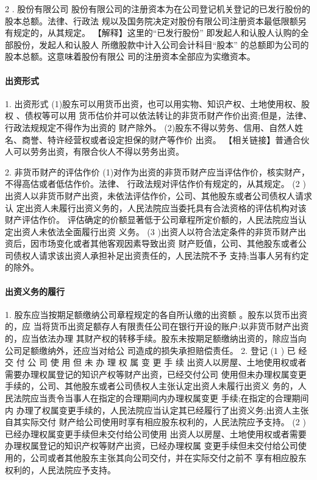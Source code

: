 \documentclass[UTF8,12pt]{ctexart}
\numberwithin{equation}{section} %
\numberwithin{figure}{section}
\numberwithin{table}{section}
\begin{document}
	2 . 股份有限公司 股份有限公司的注册资本为在公司登记机关登记的已发行股份的股本总额。法律、行政法 规以及国务院决定对股份有限公司注册资本最低限额另有规定的，从其规定。
	【解释】这里的“已发行股份” 即发起人和认股人认购的全部股份，发起人和认股人 所缴股款中计入公司会计科目“股本” 的总额即为公司的股本总额。这意味着股份有限公 司的注册资本全部应为实缴资本。
	
	\paragraph{出资形式}
	
	1. 出资形式
	(1)股东可以用货币出资，也可以用实物、知识产权、土地使用权、股权 、债权等可以用 货币估价并可以依法转让的非货币财产作价出资;但是，法律、行政法规规定不得作为出资的 财产除外。 (2)股东不得以劳务、信用、自然人姓名、商誉、特许经营权或者设定担保的财产等作价 出资。
	【相关链接】普通合伙人可以劳务出资，有限合伙人不得以劳务出资。
	
	
	2. 非货币财产的评估作价 (1)对作为出资的非货币财产应当评估作价，核实财产，不得高估或者低估作价。法律、 行政法规对评估作价有规定的，从其规定。
	(2 )出资人以非货币财产出资，未依法评估作价，公司、其他股东或者公司债权人请求认 定出资人未履行出资义务的，人民法院应当委托具有合法资格的评估机构对该财产评估作价。 评估确定的价额显著低于公司章程所定价额的，人民法院应当认定出资人未依法全面履行出资 义务。
	(3 )出资人以符合法定条件的非货币财产出资后，因市场变化或者其他客观因素导致出资 财产贬值，公司、其他股东或者公司债权人请求该出资人承担补足出资责任的，人民法院不予 支持;当事人另有约定的除外。
	
	\paragraph{出资义务的履行}
	1. 股东应当按期足额缴纳公司章程规定的各自所认缴的出资额 。股东以货币出资的，应 当将货币出资足额存人有限责任公司在银行开设的账户;以非货币财产出资的，应当依法办理 其财产权的转移手续。股东未按期足额缴纳出资的，除应当向公司足额缴纳外，还应当对给公 司造成的损失承担赔偿责任。
	2. 登记
	(1 ) 已 经 交 付 公 司 使 用 但 未 办 理 权 属 变 更 手 续
	出资人以房屋、土地使用权或者需要办理权属登记的知识产权等财产出资，已经交付公司 使用但未办理权属变更手续的，公司、其他股东或者公司债权人主张认定出资人未履行出资义 务的，人民法院应当责令当事人在指定的合理期间内办理权属变更 手续;在指定的合理期间内 办理了权属变更手续的，人民法院应当认定其已经履行了出资义务;出资人主张自其实际交付 财产给公司使用时享有相应股东权利的，人民法院应予支持。
	(2 )已经办理权属变更手续但未交付给公司使用 出资人以房屋、土地使用权或者需要办理权属登记的知识产权等财产出资，已经办理权属 变更手续但未交付给公司使用的，公司或者其他股东主张其向公司交付，并在实际交付之前不 享有相应股东权利的，人民法院应予支持。
	
\end{document}

